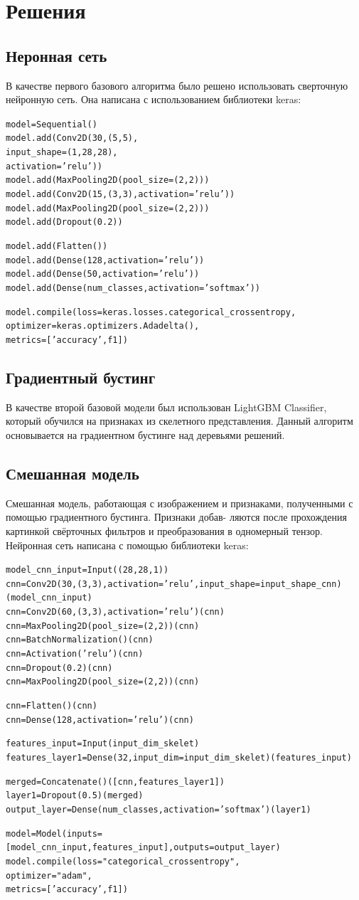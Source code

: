 \documentclass{llncs}
\begin{document}
\section{Решения}
\subsection{Неронная сеть}
В качестве первого базового алгоритма было решено использовать сверточную нейронную сеть. Она написана с использованием библиотеки keras:
\begin{alltt}
model = Sequential()
model.add(Conv2D(30, (5, 5), 
    input_shape=(1, 28, 28), 
    activation='relu'))
model.add(MaxPooling2D(pool_size=(2, 2)))
model.add(Conv2D(15, (3, 3), activation='relu'))
model.add(MaxPooling2D(pool_size=(2, 2)))
model.add(Dropout(0.2))
    
model.add(Flatten())
model.add(Dense(128, activation='relu'))
model.add(Dense(50, activation='relu'))
model.add(Dense(num_classes, activation='softmax'))

model.compile(loss = keras.losses.categorical_crossentropy, 
                  optimizer = keras.optimizers.Adadelta(), 
                  metrics=['accuracy', f1])
\end{alltt}

\subsection{Градиентный бустинг}
В качестве второй базовой модели был использован LightGBM Classifier, который обучился на признаках из скелетного представления. Данный алгоритм основывается на градиентном бустинге над деревьями решений.

\subsection{Смешанная модель}
Смешанная модель, работающая с изображением и признаками, полученными с помощью градиентного бустинга. Признаки добав-
ляются после прохождения картинкой свёрточных
фильтров и преобразования в одномерный тензор. Нейронная сеть написана с помощью библиотеки keras:
\begin{alltt}
model_cnn_input = Input((28, 28, 1))
cnn = Conv2D(30, (3, 3), activation='relu', input_shape = input_shape_cnn)(model_cnn_input)
cnn = Conv2D(60, (3, 3), activation='relu')(cnn)
cnn = MaxPooling2D(pool_size=(2, 2))(cnn)
cnn = BatchNormalization()(cnn) 
cnn = Activation('relu')(cnn)
cnn = Dropout(0.2)(cnn)
cnn = MaxPooling2D(pool_size=(2, 2))(cnn)

cnn = Flatten()(cnn)
cnn = Dense(128, activation='relu')(cnn)

features_input = Input(input_dim_skelet)
features_layer1 = Dense(32, input_dim=input_dim_skelet)(features_input)

merged = Concatenate()([cnn, features_layer1])
layer1 = Dropout(0.5)(merged)
output_layer = Dense(num_classes, activation='softmax')(layer1)

model = Model(inputs=[model_cnn_input, features_input], outputs=output_layer)
model.compile(loss="categorical_crossentropy",
              optimizer="adam",
              metrics=['accuracy', f1])
\end{alltt}
\end{document}
